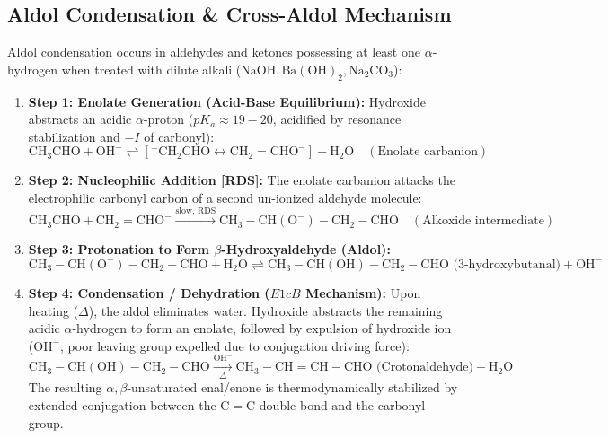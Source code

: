 \documentclass[10pt,a4paper]{article}
\begin{document}
\subsection{Aldol Condensation \& Cross-Aldol Mechanism}

\begin{conceptbox}
Aldol condensation occurs in aldehydes and ketones possessing at least one $\alpha$-hydrogen when treated with dilute alkali ($\mathrm{NaOH, Ba(OH)_2, Na_2CO_3}$):
\begin{enumerate}[leftmargin=*]
  \item \textbf{Step 1: Enolate Generation (Acid-Base Equilibrium):}
  Hydroxide abstracts an acidic $\alpha$-proton ($pK_a \approx 19-20$, acidified by resonance stabilization and $-I$ of carbonyl):
  \begin{equation}
    \mathrm{CH_3CHO} + \mathrm{OH^-} \rightleftharpoons [\mathrm{^-\!CH_2CHO} \longleftrightarrow \mathrm{CH_2=CHO^-}] + \mathrm{H_2O} \quad (\text{Enolate carbanion})
  \end{equation}
  \item \textbf{Step 2: Nucleophilic Addition [RDS]:}
  The enolate carbanion attacks the electrophilic carbonyl carbon of a second un-ionized aldehyde molecule:
  \begin{equation}
    \mathrm{CH_3CHO} + \mathrm{CH_2=CHO^-} \xrightarrow{\text{slow, RDS}} \mathrm{CH_3-CH(O^-)-CH_2-CHO} \quad (\text{Alkoxide intermediate})
  \end{equation}
  \item \textbf{Step 3: Protonation to Form $\beta$-Hydroxyaldehyde (Aldol):}
  \begin{equation}
    \mathrm{CH_3-CH(O^-)-CH_2-CHO} + \mathrm{H_2O} \rightleftharpoons \mathrm{CH_3-CH(OH)-CH_2-CHO} \text{ (3-hydroxybutanal)} + \mathrm{OH^-}
  \end{equation}
  \item \textbf{Step 4: Condensation / Dehydration ($E1cB$ Mechanism):}
  Upon heating ($\Delta$), the aldol eliminates water. Hydroxide abstracts the remaining acidic $\alpha$-hydrogen to form an enolate, followed by expulsion of hydroxide ion ($\mathrm{OH^-}$, poor leaving group expelled due to conjugation driving force):
  \begin{equation}
    \mathrm{CH_3-CH(OH)-CH_2-CHO} \xrightarrow[\Delta]{\mathrm{OH^-}} \mathrm{CH_3-CH=CH-CHO} \text{ (Crotonaldehyde)} + \mathrm{H_2O}
  \end{equation}
  The resulting $\alpha,\beta$-unsaturated enal/enone is thermodynamically stabilized by extended conjugation between the $\mathrm{C=C}$ double bond and the carbonyl group.
\end{enumerate}
\end{conceptbox}
\end{document}

